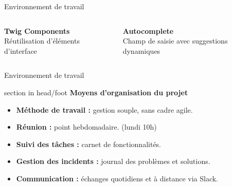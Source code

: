 \documentclass{beamer}
\begin{document}
\begin{frame}{Environnement de travail}
\begin{center}
\begin{minipage}{0.9\textwidth}
\begin{columns}[T, onlytextwidth]
      				\begin{minipage}[t][2cm][t]{\linewidth}
        					\raggedright
        					\textbf{Twig Components} \\
        					Réutilisation d'éléments d'interface
      				\end{minipage}
      				\vspace{0.7em}
          			\pause
      
      				\begin{minipage}[t][2cm][t]{\linewidth}
        					\raggedright
        					\textbf{Autocomplete} \\
        					Champ de saisie avec suggestions dynamiques
      				\end{minipage}
      
  			\end{columns}
		\end{minipage}
	\end{center}
	\vfill
\end{frame}

\begin{frame}[label=env]{Environnement de travail}
    \begin{beamercolorbox}[wd=\paperwidth,ht=1.5em,dp=0.5em,leftskip=0.5cm]{section in head/foot}
        \large \textbf{Moyens d'organisation du projet}
    \end{beamercolorbox}
    \vspace{0.5em}
    \begin{center}
\begin{minipage}{0.9\textwidth}
    \begin{itemize}
        \item<1-> \textbf{Méthode de travail :} gestion souple, sans cadre agile.
        \item<2-> \textbf{Réunion :} point hebdomadaire. (lundi 10h)
        \item<3-> \textbf{Suivi des tâches :} carnet de fonctionnalités.
        \item<4-> \textbf{Gestion des incidents :} journal des problèmes et solutions.
        \item<5-> \textbf{Communication :} échanges quotidiens et à distance via Slack.
    \end{itemize}
\end{minipage}

    \end{center}
    \vfill
\end{frame}
\end{document}
